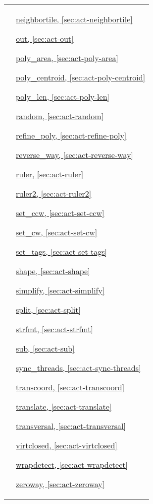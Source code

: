 \begin{tabular}{p{}p{}}
&
\hyperref[sec:act-neighbortile]{neighbortile, \ref*{sec:act-neighbortile}}

\hyperref[sec:act-out]{out, \ref*{sec:act-out}}

\hyperref[sec:act-poly-area]{poly\_area, \ref*{sec:act-poly-area}}

\hyperref[sec:act-poly-centroid]{poly\_centroid, \ref*{sec:act-poly-centroid}}

\hyperref[sec:act-poly-len]{poly\_len, \ref*{sec:act-poly-len}}

\hyperref[sec:act-random]{random, \ref*{sec:act-random}}

\hyperref[sec:act-refine-poly]{refine\_poly, \ref*{sec:act-refine-poly}}

\hyperref[sec:act-reverse-way]{reverse\_way, \ref*{sec:act-reverse-way}}

\hyperref[sec:act-ruler]{ruler, \ref*{sec:act-ruler}}

\hyperref[sec:act-ruler2]{ruler2, \ref*{sec:act-ruler2}}

\hyperref[sec:act-set-ccw]{set\_ccw, \ref*{sec:act-set-ccw}}

\hyperref[sec:act-set-cw]{set\_cw, \ref*{sec:act-set-cw}}

\hyperref[sec:act-set-tags]{set\_tags, \ref*{sec:act-set-tags}}

\hyperref[sec:act-shape]{shape, \ref*{sec:act-shape}}

\hyperref[sec:act-simplify]{simplify, \ref*{sec:act-simplify}}

\hyperref[sec:act-split]{split, \ref*{sec:act-split}}

\hyperref[sec:act-strfmt]{strfmt, \ref*{sec:act-strfmt}}

\hyperref[sec:act-sub]{sub, \ref*{sec:act-sub}}

\hyperref[sec:act-sync-threads]{sync\_threads, \ref*{sec:act-sync-threads}}

\hyperref[sec:act-transcoord]{transcoord, \ref*{sec:act-transcoord}}

\hyperref[sec:act-translate]{translate, \ref*{sec:act-translate}}

\hyperref[sec:act-transversal]{transversal, \ref*{sec:act-transversal}}

\hyperref[sec:act-virtclosed]{virtclosed, \ref*{sec:act-virtclosed}}

\hyperref[sec:act-wrapdetect]{wrapdetect, \ref*{sec:act-wrapdetect}}

\hyperref[sec:act-zeroway]{zeroway, \ref*{sec:act-zeroway}}

\end{tabular}
